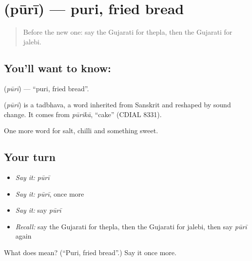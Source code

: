 \section[\texorpdfstring{\gu{પૂરી} (pūrī)}{પૂરી (pūrī)}]{ (pūrī) — puri, fried bread}

\label{lesson:GU-C60-puri}



\begin{quote}
Before the new one: say the Gujarati for thepla, then the Gujarati for jalebi.
\end{quote}

\subsection*{You'll want to know: }
\textbf{} (\emph{pūrī}) — \textquotedblleft{}puri, fried bread\textquotedblright{}.

\begin{cousinweb}
\textbf{} (\emph{pūrī}) is a tadbhava, a word inherited from Sanskrit and reshaped by sound change. It comes from \emph{pūrikā}, \textquotedblleft{}cake\textquotedblright{} (CDIAL 8331).
\end{cousinweb}

\begin{grammarlens}[title={What you've built}]
One more word for salt, chilli and something sweet.
\end{grammarlens}

\subsection*{Your turn}
\begin{itemize}
\raggedright
  \item \emph{Say it:} \emph{pūrī}
  \item \emph{Say it:} \emph{pūrī}, once more
  \item \emph{Say it:} say \emph{pūrī}
  \item \emph{Recall:} say the Gujarati for thepla, then the Gujarati for jalebi, then say \emph{pūrī} again
\end{itemize}

\begin{tcolorbox}[breakable,colback=teal!4,colframe=teal!35!black,title={Before you move on}]
What does  mean? (\textquotedblleft{}Puri, fried bread\textquotedblright{}.) Say it once more.
\end{tcolorbox}
